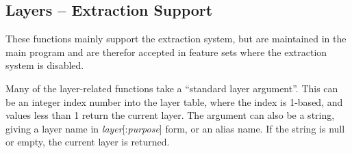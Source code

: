 \subsection{Layers -- Extraction Support}

These functions mainly support the extraction system, but are
maintained in the main program and are therefor accepted in feature
sets where the extraction system is disabled.

Many of the layer-related functions take a ``standard layer
argument''.  This can be an integer index number into the layer table,
where the index is 1-based, and values less than 1 return the current
layer.  The argument can also be a string, giving a layer name in {\it
layer\/}[{\vt :}{\it purpose\/}] form, or an alias name.  If the
string is null or empty, the current layer is returned.

